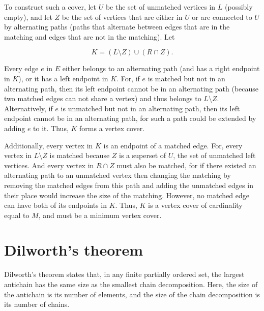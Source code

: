 \documentclass[a4paper]{article}
\begin{document}
\begin{landscape}
\begin{multicols}{2}
To construct such a cover, let $U$ be the set of unmatched vertices in $L$ (possibly empty), and let $Z$ be the set of vertices that are either in $U$ or are connected to $U$ by alternating paths (paths that alternate between edges that are in the matching and edges that are not in the matching). Let

$$K=(L\setminus Z)\cup (R\cap Z).$$

Every edge $e$ in $E$ either belongs to an alternating path (and has a right endpoint in $K$), or it has a left endpoint in $K$. For, if $e$ is matched but not in an alternating path, then its left endpoint cannot be in an alternating path (because two matched edges can not share a vertex) and thus belongs to $L\setminus Z$. Alternatively, if $e$ is unmatched but not in an alternating path, then its left endpoint cannot be in an alternating path, for such a path could be extended by adding $e$ to it. Thus, $K$ forms a vertex cover.

Additionally, every vertex in $K$ is an endpoint of a matched edge. For, every vertex in $L\setminus Z$ is matched because $Z$ is a superset of $U$, the set of unmatched left vertices. And every vertex in $R\cap Z$ must also be matched, for if there existed an alternating path to an unmatched vertex then changing the matching by removing the matched edges from this path and adding the unmatched edges in their place would increase the size of the matching. However, no matched edge can have both of its endpoints in $K$. Thus, $K$ is a vertex cover of cardinality equal to $M$, and must be a minimum vertex cover.

\section{Dilworth's theorem}

Dilworth's theorem states that, in any finite partially ordered set, the largest antichain has the same size as the smallest chain decomposition. Here, the size of the antichain is its number of elements, and the size of the chain decomposition is its number of chains.


\end{multicols}
\end{landscape}
\end{document}
